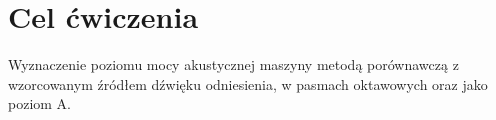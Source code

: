 \section{Cel ćwiczenia}
Wyznaczenie poziomu mocy akustycznej maszyny metodą porównawczą z wzorcowanym źródłem dźwięku odniesienia, w pasmach oktawowych oraz jako poziom A.
